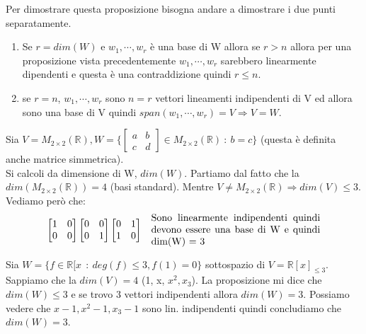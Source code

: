 \begin{demostration}
Per dimostrare questa proposizione bisogna andare a dimostrare i due punti separatamente.
\begin{enumerate}
    \item Se $r = dim(W)$ e $w_1, \cdots, w_r$ è una base di W allora se $r > n$ allora per una proposizione vista precedentemente $w_1, \cdots, w_r$ sarebbero linearmente dipendenti e questa è una contraddizione quindi $r\leq n$.
    \item se $r = n$, $w_1, \cdots, w_r$ sono $n = r$ vettori lineamenti indipendenti di V ed allora sono una base di V quindi $span(w_1, \cdots, w_r) = V \Longrightarrow V = W$.
\end{enumerate}
\end{demostration}

\begin{example}
Sia $V = M_{2 \times 2}(\mathbb{R}), W = \{\begin{bmatrix}a & b \\ c & d\end{bmatrix} \in M_{2 \times 2}(\mathbb{R}) \::\: b = c\}$ (questa è definita anche matrice simmetrica).\\
Si calcoli da dimensione di W, $dim(W)$. Partiamo dal fatto che la $dim(M_{2 \times 2}(\mathbb{R})) = 4$ (basi standard). Mentre $V \neq M_{2 \times 2}(\mathbb{R})  \Longrightarrow dim(V) \leq 3$. Vediamo però che:
\[
\begin{bmatrix}1 & 0 \\ 0 & 0\end{bmatrix}
\begin{bmatrix}0 & 0 \\ 0 & 1\end{bmatrix}
\begin{bmatrix}0 & 1 \\ 1 & 0\end{bmatrix}
\hspace{.3cm}
\parbox{6cm}{Sono linearmente indipendenti quindi devono essere una base di W e quindi dim(W) = 3}
\]
\end{example}

\begin{example}
Sia $W = \{f \in \mathbb{R}[x\ \::\: deg(f) \leq 3, f(1) = 0\}$ sottospazio di $V = \mathbb{R}[x]_{\leq 3}$. Sappiamo che la $dim(V) = 4$ (1, x, $x^2, x_3$). La proposizione mi dice che $dim(W) \leq 3$ e se trovo 3 vettori indipendenti allora $dim(W) = 3$. Possiamo vedere che $x-1, x^2-1, x_3-1$ sono lin. indipendenti quindi concludiamo che $dim(W) = 3$.
\end{example}

